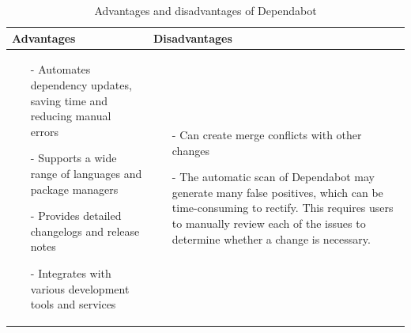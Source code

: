 \begin{table}[H]
\centering
\begin{tabular}{|>{\raggedright\arraybackslash}p{6cm}|>{\raggedright\arraybackslash}p{6cm}|}
\hline
\textbf{Advantages} & \textbf{Disadvantages} \\
\hline
\begin{itemize}
\item [-]Automates dependency updates, saving time and reducing manual errors 
\item [-] Supports a wide range of languages and package managers 
\item [-] Provides detailed changelogs and release notes 
\item [-] Integrates with various development tools and services
\end{itemize}
&
\begin{itemize}
\item [-] Can create merge conflicts with other changes 
\item [-] The automatic scan of Dependabot may generate many false positives, which can be time-consuming to rectify. This requires users to manually review each of the issues to determine whether a change is necessary. 

\end{itemize}
\\
\hline
\end{tabular}
\caption{Advantages and disadvantages of Dependabot}
\label{tab:dependabot}
\end{table}

